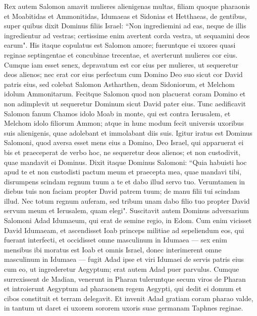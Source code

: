 \begin{biblechapter}  
\verse Rex autem Salomon amavit mulieres alienigenas multas, filiam quoque pharaonis et Moabitidas et Ammonitidas, Idumaeas et Sidonias et Hetthaeas, 
\verse de gentibus, super quibus dixit Dominus filiis Israel: “Non ingrediemini ad eas, neque de illis ingredientur ad vestras; certissime enim avertent corda vestra, ut sequamini deos earum". His itaque copulatus est Salomon amore; 
\verse fueruntque ei uxores quasi reginae septingentae et concubinae trecentae, et averterunt mulieres cor eius. 
\verse Cumque iam esset senex, depravatum est cor eius per mulieres, ut sequeretur deos alienos; nec erat cor eius perfectum cum Domino Deo suo sicut cor David patris eius, 
\verse sed colebat Salomon Astharthen, deam Sidoniorum, et Melchom idolum Ammonitarum. 
\verse Fecitque Salomon quod non placuerat coram Domino et non adimplevit ut sequeretur Dominum sicut David pater eius. 
\verse Tunc aedificavit Salomon fanum Chamos idolo Moab in monte, qui est contra Ierusalem, et Melchom idolo filiorum Ammon; 
\verse atque in hunc modum fecit universis uxoribus suis alienigenis, quae adolebant et immolabant diis suis. 
\verse Igitur iratus est Dominus Salomoni, quod aversa esset mens eius a Domino, Deo Israel, qui apparuerat ei bis 
\verse et praeceperat de verbo hoc, ne sequeretur deos alienos; et non custodivit, quae mandavit ei Dominus. 
\verse Dixit itaque Dominus Salomoni: “Quia habuisti hoc apud te et non custodisti pactum meum et praecepta mea, quae mandavi tibi, disrumpens scindam regnum tuum a te et dabo illud servo tuo. 
\verse Verumtamen in diebus tuis non faciam propter David patrem tuum; de manu filii tui scindam illud. 
\verse Nec totum regnum auferam, sed tribum unam dabo filio tuo propter David servum meum et Ierusalem, quam elegi". 
\verse Suscitavit autem Dominus adversarium Salomoni Adad Idumaeum, qui erat de semine regio, in Edom. 
\verse Cum enim vicisset David Idumaeam, et ascendisset Ioab princeps militiae ad sepeliendum eos, qui fuerant interfecti, et occidisset omne masculinum in Idumaea 
\verse — sex enim mensibus ibi moratus est Ioab et omnis Israel, donec interimerent omne masculinum in Idumaea — 
\verse fugit Adad ipse et viri Idumaei de servis patris eius cum eo, ut ingrederetur Aegyptum; erat autem Adad puer parvulus. 
\verse Cumque surrexissent de Madian, venerunt in Pharan tuleruntque secum viros de Pharan et introierunt Aegyptum ad pharaonem regem Aegypti, qui dedit ei domum et cibos constituit et terram delegavit.  
\verse Et invenit Adad gratiam coram pharao valde, in tantum ut daret ei uxorem sororem uxoris suae germanam Taphnes reginae. 

\end{biblechapter}
